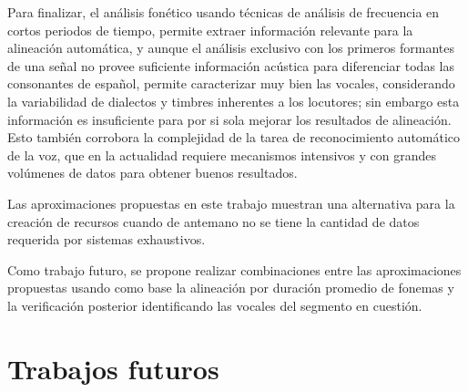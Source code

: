 Para finalizar, el análisis fonético usando técnicas de análisis de frecuencia en cortos periodos de tiempo, permite extraer información relevante para la alineación automática, y aunque el análisis exclusivo con los primeros formantes de una señal no provee suficiente información acústica para diferenciar todas las consonantes de español, permite caracterizar muy bien las vocales, considerando la variabilidad de dialectos y timbres inherentes a los locutores; sin embargo esta información es insuficiente para por si sola mejorar los resultados de alineación. Esto también corrobora la complejidad de la tarea de reconocimiento automático de la voz, que en la actualidad requiere mecanismos intensivos y con grandes volúmenes de datos para obtener buenos resultados.

Las aproximaciones propuestas en este trabajo muestran una alternativa para la creación de recursos cuando de antemano no se tiene la cantidad de datos requerida por sistemas exhaustivos.

Como trabajo futuro, se propone realizar combinaciones entre las aproximaciones propuestas usando como base la alineación por duración promedio de fonemas y la verificación posterior identificando las vocales del segmento en cuestión.


\section{Trabajos futuros}